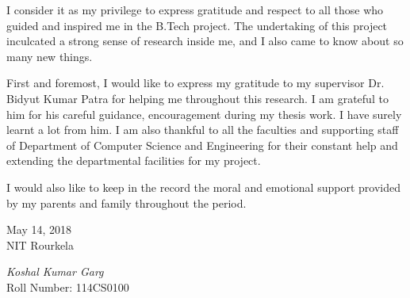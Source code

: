 \thispagestyle{empty} 
\noindent 


I consider it as my privilege to express gratitude and respect to all those who guided
and inspired me in the B.Tech project. The undertaking of this project inculcated a
strong sense of research inside me, and I also came to know about so many new things.

\par 
First and foremost, I would like to express my gratitude to my supervisor Dr.
Bidyut Kumar Patra for helping me throughout this research. I am grateful to
him for his careful guidance, encouragement during my thesis work. I have surely
learnt a lot from him. I am also thankful to all the faculties and supporting staff
of Department of Computer Science and Engineering for their constant help and
extending the departmental facilities for my project.


\par 
I would also like to keep in the record the moral and emotional support provided
by my parents and family throughout the period.

\vspace{15mm}
\begin{minipage}{.45\linewidth}
\begin{flushleft}
May 14, 2018\\
NIT Rourkela
\end{flushleft}
\end{minipage}
\begin{minipage}{.45\linewidth}
\begin{flushright}
\textit{Koshal Kumar Garg}\\
Roll Number: 114CS0100
\end{flushright}
\end{minipage}